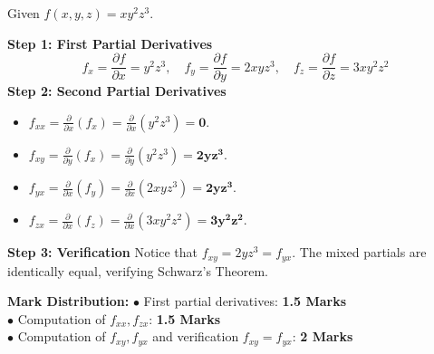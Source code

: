 \begin{solutionbox}
Given $f(x,y,z) = x y^2 z^3$.

\textbf{Step 1: First Partial Derivatives}
\[
f_x = \frac{\partial f}{\partial x} = y^2 z^3, \quad f_y = \frac{\partial f}{\partial y} = 2x y z^3, \quad f_z = \frac{\partial f}{\partial z} = 3x y^2 z^2
\]
\textbf{Step 2: Second Partial Derivatives}
\begin{itemize}[leftmargin=6mm]
    \item $f_{xx} = \frac{\partial}{\partial x}(f_x) = \frac{\partial}{\partial x}(y^2 z^3) = \mathbf{0}$.
    \item $f_{xy} = \frac{\partial}{\partial y}(f_x) = \frac{\partial}{\partial y}(y^2 z^3) = \mathbf{2y z^3}$.
    \item $f_{yx} = \frac{\partial}{\partial x}(f_y) = \frac{\partial}{\partial x}(2x y z^3) = \mathbf{2y z^3}$.
    \item $f_{zx} = \frac{\partial}{\partial x}(f_z) = \frac{\partial}{\partial x}(3x y^2 z^2) = \mathbf{3y^2 z^2}$.
\end{itemize}
\textbf{Step 3: Verification}
Notice that $f_{xy} = 2y z^3 = f_{yx}$. The mixed partials are identically equal, verifying Schwarz's Theorem.

\begin{markingrubric}
\textbf{Mark Distribution:}
$\bullet$ First partial derivatives: \textbf{1.5 Marks}\\
$\bullet$ Computation of $f_{xx}, f_{zx}$: \textbf{1.5 Marks}\\
$\bullet$ Computation of $f_{xy}, f_{yx}$ and verification $f_{xy} = f_{yx}$: \textbf{2 Marks}
\end{markingrubric}
\end{solutionbox}

